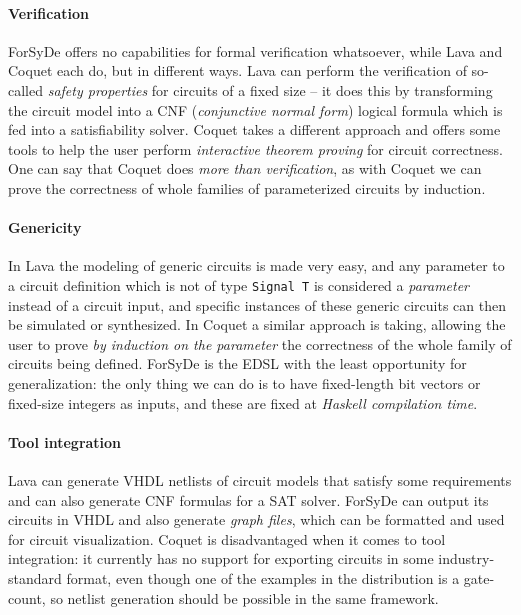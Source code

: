     \paragraph{Verification}
        ForSyDe offers no capabilities for formal verification whatsoever, while Lava and Coquet
        each do, but in different ways. Lava can perform the verification of so-called \emph{safety
        properties} for circuits of a fixed size -- it does this by transforming the circuit model
        into a CNF (\emph{conjunctive normal form}) logical formula which is fed into a
        satisfiability solver. Coquet takes a different approach and offers some tools to help the
        user perform \emph{interactive theorem proving} for circuit correctness. One can say that
        Coquet does \emph{more than verification}, as with Coquet we can prove the correctness of
        whole families of parameterized circuits by induction.

    \paragraph{Genericity}
        In Lava the modeling of generic circuits is made very easy, and any parameter to a circuit
        definition which is not of type \texttt{Signal T} is considered a \emph{parameter} instead
        of a circuit input, and specific instances of these generic circuits can then be simulated
        or synthesized. In Coquet a similar approach is taking, allowing the user to prove \emph{by
        induction on the parameter} the correctness of the whole family of circuits being defined.
        ForSyDe is the \ac{EDSL} with the least opportunity for generalization: the only thing we can do
        is to have fixed-length bit vectors or fixed-size integers as inputs, and these are fixed at
        \emph{Haskell compilation time}.

    \paragraph{Tool integration}
        Lava can generate VHDL netlists of circuit models that satisfy some requirements and can
        also generate CNF formulas for a SAT solver. ForSyDe can output its circuits in VHDL and
        also generate \emph{graph files}, which can be formatted and used for circuit visualization.
        Coquet is disadvantaged when it comes to tool integration: it currently has no support for
        exporting circuits in some industry-standard format, even though one of the examples in the
        distribution is a gate-count, so netlist generation should be possible in the same
        framework.

